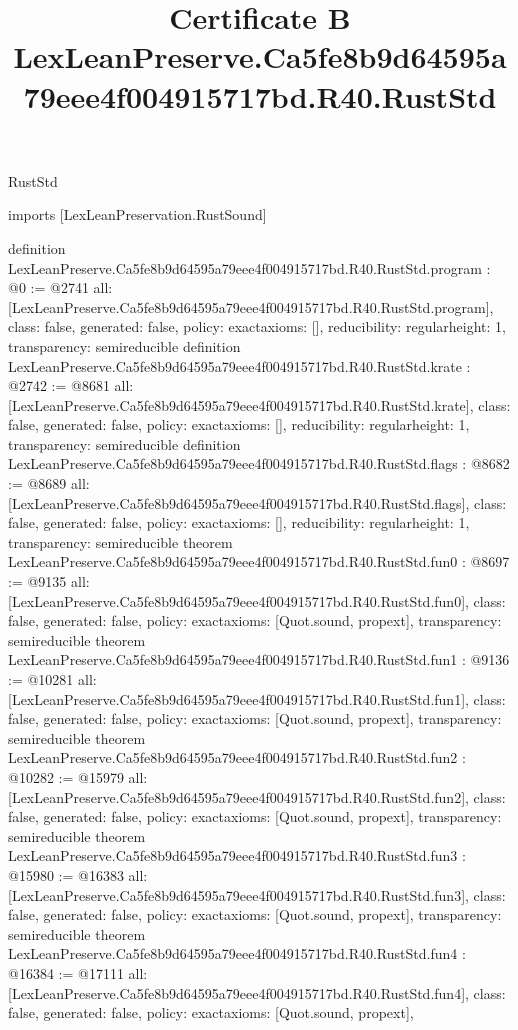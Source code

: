 \begin{lexlean}{RustStd}
\title{Certificate B LexLeanPreserve.Ca5fe8b9d64595a79eee4f004915717bd.R40.RustStd}
\begin{coremodule}
imports [LexLeanPreservation.RustSound]

definition LexLeanPreserve.Ca5fe8b9d64595a79eee4f004915717bd.R40.RustStd.program : @0 := @2741 {
  all: [LexLeanPreserve.Ca5fe8b9d64595a79eee4f004915717bd.R40.RustStd.program],
  class: false,
  generated: false,
  policy: exact{axioms: []},
  reducibility: regular{height: 1},
  transparency: semireducible
}
definition LexLeanPreserve.Ca5fe8b9d64595a79eee4f004915717bd.R40.RustStd.krate : @2742 := @8681 {
  all: [LexLeanPreserve.Ca5fe8b9d64595a79eee4f004915717bd.R40.RustStd.krate],
  class: false,
  generated: false,
  policy: exact{axioms: []},
  reducibility: regular{height: 1},
  transparency: semireducible
}
definition LexLeanPreserve.Ca5fe8b9d64595a79eee4f004915717bd.R40.RustStd.flags : @8682 := @8689 {
  all: [LexLeanPreserve.Ca5fe8b9d64595a79eee4f004915717bd.R40.RustStd.flags],
  class: false,
  generated: false,
  policy: exact{axioms: []},
  reducibility: regular{height: 1},
  transparency: semireducible
}
theorem LexLeanPreserve.Ca5fe8b9d64595a79eee4f004915717bd.R40.RustStd.fun0 : @8697 := @9135 {
  all: [LexLeanPreserve.Ca5fe8b9d64595a79eee4f004915717bd.R40.RustStd.fun0],
  class: false,
  generated: false,
  policy: exact{axioms: [Quot.sound, propext]},
  transparency: semireducible
}
theorem LexLeanPreserve.Ca5fe8b9d64595a79eee4f004915717bd.R40.RustStd.fun1 : @9136 := @10281 {
  all: [LexLeanPreserve.Ca5fe8b9d64595a79eee4f004915717bd.R40.RustStd.fun1],
  class: false,
  generated: false,
  policy: exact{axioms: [Quot.sound, propext]},
  transparency: semireducible
}
theorem LexLeanPreserve.Ca5fe8b9d64595a79eee4f004915717bd.R40.RustStd.fun2 : @10282 := @15979 {
  all: [LexLeanPreserve.Ca5fe8b9d64595a79eee4f004915717bd.R40.RustStd.fun2],
  class: false,
  generated: false,
  policy: exact{axioms: [Quot.sound, propext]},
  transparency: semireducible
}
theorem LexLeanPreserve.Ca5fe8b9d64595a79eee4f004915717bd.R40.RustStd.fun3 : @15980 := @16383 {
  all: [LexLeanPreserve.Ca5fe8b9d64595a79eee4f004915717bd.R40.RustStd.fun3],
  class: false,
  generated: false,
  policy: exact{axioms: [Quot.sound, propext]},
  transparency: semireducible
}
theorem LexLeanPreserve.Ca5fe8b9d64595a79eee4f004915717bd.R40.RustStd.fun4 : @16384 := @17111 {
  all: [LexLeanPreserve.Ca5fe8b9d64595a79eee4f004915717bd.R40.RustStd.fun4],
  class: false,
  generated: false,
  policy: exact{axioms: [Quot.sound, propext]},
}
\end{coremodule}
\end{lexlean}
